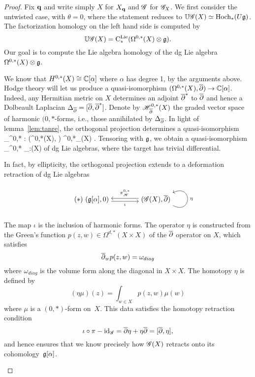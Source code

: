 \begin{proof}
Fix ${\bf q}$ and write simply $X$ for $X_{\bf q}$ and $\mathscr G$ for $\mathscr G_X$. 
We first consider the untwisted case, with $\theta = 0$, where the statement reduces to $\mathbb U\mathscr G(X) \simeq {\rm Hoch}_*(U \mathfrak g)$.
The factorization homology on the left hand side is computed by
\[
\mathbb U \mathscr G (X) = {\rm C}^{\rm Lie}_*(\Omega^{0,*}(X) \otimes \mathfrak g) .
\]
Our goal is to compute the Lie algebra homology of the dg Lie algebra $\Omega^{0,*}(X) \otimes \mathfrak g$.  

We know that $H^{0,*}(X) \cong \mathbb C[\alpha]$ where $\alpha$ has degree 1, by the arguments above.
Hodge theory will let us produce a quasi-isomorphism $(\Omega^{0,*}(X), \overline{\partial}) \to \mathbb C[\alpha]$.
Indeed, any Hermitian metric on $X$ determines an adjoint $\overline{\partial}^*$ to $\overline{\partial}$ and hence a Dolbeault Laplacian $\Delta_{\overline{\partial}} = [\overline{\partial},\overline{\partial}^*]$.
Denote by $\mathscr H^{0,*}_{\overline{\partial}}(X)$ the graded vector space of harmonic $(0,*$-forms, i.e., those annihilated by $\Delta_{\overline{\partial}}$. 
In light of lemma~\ref{lem:tanre}, the orthogonal projection determines a quasi-isomorphism
\beqn\label{hopfquasi}
\pi_{\sH}^{0,*} : \left(\Omega^{0,*}(X), \dbar \right) \xto{\simeq} \sH^{0,*}_{\dbar}(X) \cong \CC[\alpha].
\eeqn
Tensoring with $\mathfrak g$, we obtain a quasi-isomorphism 
\beqn\label{Lieproj}
\pi_{\sH}^{0,*} \otimes \id_\fg :\sG (X) \to \fg[\alpha]
\eeqn
of dg Lie algebras, where the target has trivial differential.

\begin{rmk}\label{rmk: hpl1}
In fact, by ellipticity, the orthogonal projection extends to a deformation retraction of dg Lie algebras
\begin{equation*}\label{contraction}\tag{$\ast$}
  \begin{tikzpicture}[baseline=(L.base),anchor=base,->,auto,swap]
     \path node (L) {$(\fg[\alpha],0)$} ++(3,0) node (M) {$(\sG (X), \dbar)$} 
     (M.mid) +(0,.075) coordinate (raise) +(0,-.075) coordinate (lower);
     \draw (L.east |- lower) to node {$\scriptstyle \iota$} (M.west |- lower);
     \draw (M.west |- raise) to node {$\scriptstyle \pi_{\sH}^{0,*} $} (L.east |- raise);
     \draw (M.south east) ..controls +(1,-.5) and +(1,.5) .. node {$\scriptstyle \eta$} (M.north east);
  \end{tikzpicture}\end{equation*}
The map $\iota$ is the inclusion of harmonic forms. 
The operator $\eta$ is constructed from the Green's function $p(z,w) \in \Omega^{d,*}(X \times X)$ of the $\overline{\partial}$ operator on $X$, 
which satisfies 
\[
\overline{\partial}_w p(z,w) = \omega_{diag}
\]
where $\omega_{diag}$ is the volume form along the diagonal in $X \times X$. 
The homotopy $\eta$ is defined by
\[
(\eta \mu)(z) = \int_{w \in X} p(z,w) \mu(w)
\]
where $\mu$ is a $(0,*)$-form on~$X$.
This data satisfies the homotopy retraction condition
\[
\iota \circ \pi - {\rm id}_{\mathscr G} = \overline{\partial} \eta +\eta \overline{\partial} = [\overline{\partial},\eta],
\]
and hence ensures that we know precisely how $\mathscr G(X)$ retracts onto its cohomology~$\mathfrak g[\alpha]$.
\end{rmk}



\end{proof}

